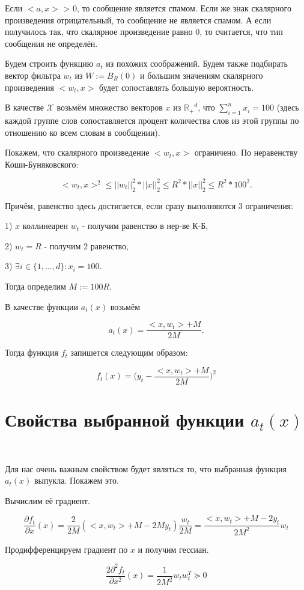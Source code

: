 \documentclass[12pt]{article}
\theoremstyle{definition}
\begin{document}
Если $<a, x>$ > 0, то сообщение является спамом. Если же знак скалярного произведения отрицательный, то сообщение не является спамом. А если получилось так, что скалярное произведение равно 0, то считается, что тип сообщения не определён.

Будем строить функцию $a_t$ из похожих соображений. Будем также подбирать вектор фильтра $w_t$ из $W := B_R(0)$ и большим значениям скалярного произведения $<w_t, x>$ будет сопоставлять большую вероятность.

В качестве $\mathcal{X}$ возьмём множество векторов $x$ из $\mathbb{R_{+}}^d$, что $\sum\limits_{i=1}^n x_i = 100$ (здесь каждой группе слов сопоставляется процент количества слов из этой группы по отношению ко всем словам в сообщении).

Покажем, что скалярного произведение $<w_t, x>$ ограничено. По неравенству Коши-Буняковского:

$$<w_t, x>^2 \leq ||w_t||_2^2*||x||_2^2 \leq R^2*||x||_2^2 \leq R^2*100^2.$$

Причём, равенство здесь достигается, если сразу выполняются 3 ограничения:

1) $x$ коллинеарен $w_t$ - получим равенство в нер-ве К-Б,

2) $w_t=R$ - получим 2 равенство,

3) $\exists i \in \{1, \dots, d\}: x_i = 100$.

Тогда определим $M := 100R$.

В качестве функции $a_t(x)$ возьмём

 $$a_t(x) = \frac{<x, w_t>+M}{2M}.$$
 
 Тогда функция $f_t$ запишется следующим образом:
 
 $$f_t(x) = \bigg(y_t - \frac{<x, w_t>+M}{2M}\bigg)^2$$
 
\section*{Свойства выбранной функции $a_t(x)$}
$ $

Для нас очень важным свойством будет являться то, что выбранная функция $a_t(x)$ выпукла. Покажем это.

Вычислим её градиент.

$$\frac{\partial f_t}{\partial x}(x) = \frac{2}{2M}(<x, w_t>+M-2My_t)\frac{w_t}{2M} = \frac{<x, w_t>+M-2y_t}{2M^2}w_t$$

Продифференцируем градиент по $x$ и получим гессиан.

$$\frac{2\partial^2 f_t}{\partial x^2}(x) = \frac{1}{2M^2}w_tw_t^T \succeq 0$$
\end{document}
